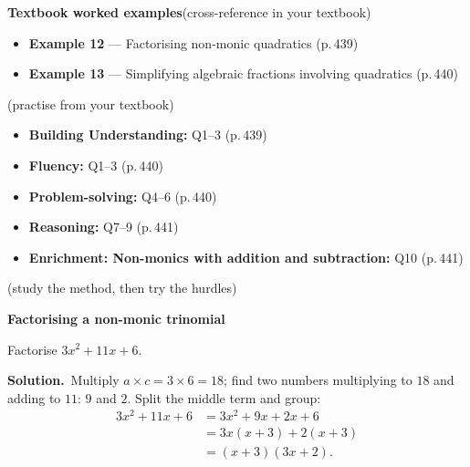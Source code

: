 \documentclass[11pt]{article}
\begin{document}
\begin{refbox}
{\bfseries\color{chalkdk}Textbook worked examples}\;\textcolor{inksoft}{\small(cross-reference in your textbook)}\\[3pt]
\begin{itemize}[leftmargin=16pt,itemsep=1pt,topsep=2pt]
  \item \textbf{Example 12} --- Factorising non-monic quadratics \textcolor{inksoft}{(p.\,439)}
  \item \textbf{Example 13} --- Simplifying algebraic fractions involving quadratics \textcolor{inksoft}{(p.\,440)}
\end{itemize}
\;\textcolor{inksoft}{\small(practise from your textbook)}\\[3pt]
\begin{itemize}[leftmargin=16pt,itemsep=1pt,topsep=2pt]
  \item \textbf{Building Understanding:} Q1--3 \textcolor{inksoft}{(p.\,439)}
  \item \textbf{Fluency:} Q1--3 \textcolor{inksoft}{(p.\,440)}
  \item \textbf{Problem-solving:} Q4--6 \textcolor{inksoft}{(p.\,440)}
  \item \textbf{Reasoning:} Q7--9 \textcolor{inksoft}{(p.\,441)}
  \item \textbf{Enrichment: Non-monics with addition and subtraction:} Q10 \textcolor{inksoft}{(p.\,441)}
\end{itemize}\end{refbox}

\;\textcolor{inksoft}{\small(study the method, then try the hurdles)}\par

\begin{workedbox}

{\bfseries\color{chalkdk}Factorising a non-monic trinomial}\par\vspace{3pt}

Factorise $3x^2+11x+6$.\par\vspace{2pt}

{\bfseries Solution.}\ Multiply $a\times c=3\times6=18$; find two numbers multiplying to $18$ and adding to $11$: $9$ and $2$. Split the middle term and group: \begin{align*}3x^2+11x+6&=3x^2+9x+2x+6\\&=3x(x+3)+2(x+3)\\&=(x+3)(3x+2).\end{align*}

\end{workedbox}
\end{document}
